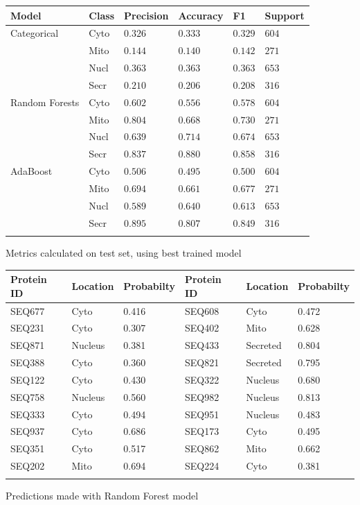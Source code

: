 \documentclass{bioinfo}
\begin{document}
\begin{table}[!h]
 {\begin{tabular}{@{}llllll@{}}\toprule  Model & Class & Precision  & Accuracy & F1 & Support\\\midrule
Categorical  & Cyto & $0.326$ & $0.333$ & $0.329$ & $604$ \\
        & Mito & $0.144$ & $0.140$ & $0.142$ & $271$ \\
        & Nucl & $0.363$ & $0.363$ & $0.363$ & $653$ \\
        & Secr & $0.210$ & $0.206$ & $0.208$ & $316$ \\
\midrule
Random Forests & Cyto & $0.602$ & $0.556$ & $0.578$ & $604$ \\
        & Mito & $0.804$ & $0.668$ & $0.730$ & $271$ \\
        & Nucl & $0.639$ & $0.714$ & $0.674$ & $653$ \\
        & Secr & $0.837$ & $0.880$ & $0.858$ & $316$ \\
\midrule
AdaBoost & Cyto & $0.506$ & $0.495$ & $0.500$ & $604$ \\
        & Mito & $0.694$ & $0.661$ & $0.677$ & $271$ \\
        & Nucl & $0.589$ & $0.640$ & $0.613$ & $653$ \\
        & Secr & $0.895$ & $0.807$ & $0.849$ & $316$ \\\botrule

\end{tabular}}{Metrics calculated on test set, using best trained model}
\end{table}

\begin{table}[!h]
 {\begin{tabular}{@{}lll|lll@{}}\toprule Protein ID  &  Location & Probabilty & Protein ID  &  Location & Probabilty\\\midrule
SEQ677 & Cyto & 0.416  & SEQ608 & Cyto & 0.472  \\
SEQ231 & Cyto & 0.307  & SEQ402 & Mito & 0.628  \\
SEQ871 & Nucleus & 0.381  & SEQ433 & Secreted & 0.804  \\
SEQ388 & Cyto & 0.360  & SEQ821 & Secreted & 0.795  \\
SEQ122 & Cyto & 0.430  & SEQ322 & Nucleus & 0.680  \\
SEQ758 & Nucleus & 0.560  & SEQ982 & Nucleus & 0.813  \\
SEQ333 & Cyto & 0.494  & SEQ951 & Nucleus & 0.483  \\
SEQ937 & Cyto & 0.686  & SEQ173 & Cyto & 0.495  \\
SEQ351 & Cyto & 0.517  & SEQ862 & Mito & 0.662  \\
SEQ202 & Mito & 0.694  & SEQ224 & Cyto & 0.381  \\\botrule
\end{tabular}}{Predictions made with Random Forest model}
\end{table}
\end{document}
